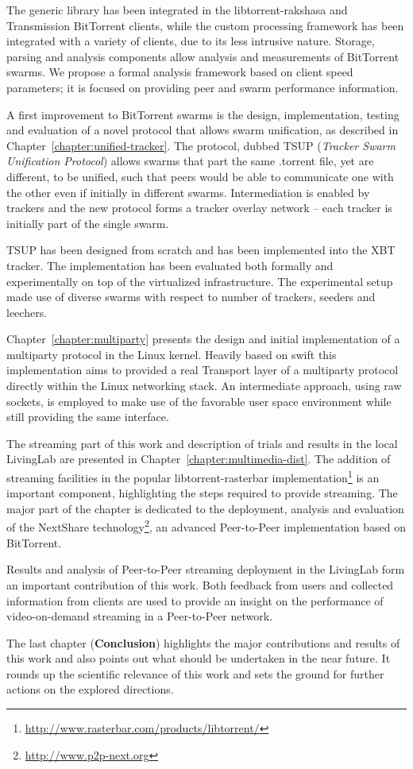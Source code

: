 The generic library has been integrated in the libtorrent-rakshasa and
Transmission BitTorrent clients, while the custom processing framework has
been integrated with a variety of clients, due to its less intrusive nature.
Storage, parsing and analysis components allow analysis and measurements of
BitTorrent swarms. We propose a formal analysis framework based on client
speed parameters; it is focused on providing peer and swarm performance
information.

A first improvement to BitTorrent swarms is the design, implementation,
testing and evaluation of a novel protocol that allows swarm unification, as
described in Chapter~\ref{chapter:unified-tracker}. The protocol, dubbed TSUP
(\textit{Tracker Swarm Unification Protocol}) allows swarms that part the same
.torrent file, yet are different, to be unified, such that peers would be able
to communicate one with the other even if initially in different swarms.
Intermediation is enabled by trackers and the new protocol forms a tracker
overlay network -- each tracker is initially part of the single swarm.

TSUP has been designed from scratch and has been implemented into the XBT
tracker. The implementation has been evaluated both formally and
experimentally on top of the virtualized infrastructure. The experimental
setup made use of diverse swarms with respect to number of trackers, seeders
and leechers.

Chapter~\ref{chapter:multiparty} presents the design and initial
implementation of a multiparty protocol in the Linux kernel. Heavily based on
swift this implementation aims to provided a real Transport layer of a
multiparty protocol directly within the Linux networking stack. An
intermediate approach, using raw sockets, is employed to make use of the
favorable user space environment while still providing the same interface.

The streaming part of this work and description of trials and results in the
local LivingLab are presented in Chapter~\ref{chapter:multimedia-dist}. The
addition of streaming facilities in the popular libtorrent-rasterbar
implementation\footnote{\url{http://www.rasterbar.com/products/libtorrent/}}
is an important component, highlighting the steps required to provide
streaming. The major part of the chapter is dedicated to the deployment,
analysis and evaluation of the NextShare
technology\footnote{\url{http://www.p2p-next.org}}, an advanced Peer-to-Peer
implementation based on BitTorrent.

Results and analysis of Peer-to-Peer streaming deployment in the LivingLab
form an important contribution of this work. Both feedback from users and
collected information from clients are used to provide an insight on the
performance of video-on-demand streaming in a Peer-to-Peer network.

The last chapter (\textbf{Conclusion}) highlights the major contributions and
results of this work and also points out what should be undertaken in the near
future. It rounds up the scientific relevance of this work and sets the ground
for further actions on the explored directions.
